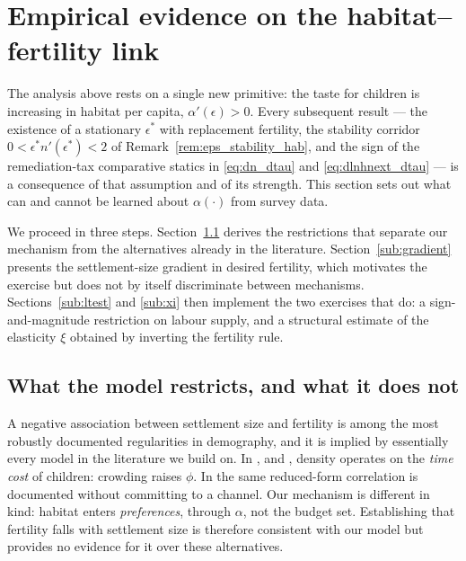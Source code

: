 \documentclass[11pt]{article}
\begin{document}

\section{Empirical evidence on the habitat--fertility link}
\label{sec:empirics}

The analysis above rests on a single new primitive: the taste for children is increasing in habitat
per capita, $\alpha'(\epsilon)>0$. Every subsequent result --- the existence of a stationary
$\epsilon^\ast$ with replacement fertility, the stability corridor $0<\epsilon^\ast
n'(\epsilon^\ast)<2$ of Remark~\ref{rem:eps_stability_hab}, and the sign of the remediation-tax
comparative statics in \eqref{eq:dn_dtau} and \eqref{eq:dlnhnext_dtau} --- is a consequence of that
assumption and of its strength. This section sets out what can and cannot be learned about
$\alpha(\cdot)$ from survey data.

We proceed in three steps. Section~\ref{sub:restrictions} derives the restrictions that separate our
mechanism from the alternatives already in the literature. Section~\ref{sub:gradient} presents the
settlement-size gradient in desired fertility, which motivates the exercise but does not by itself
discriminate between mechanisms. Sections~\ref{sub:ltest} and \ref{sub:xi} then implement the two
exercises that do: a sign-and-magnitude restriction on labour supply, and a structural estimate of
the elasticity $\xi$ obtained by inverting the fertility rule.

\subsection{What the model restricts, and what it does not}
\label{sub:restrictions}

A negative association between settlement size and fertility is among the most robustly documented
regularities in demography, and it is implied by essentially every model in the literature we build
on. In \citet{DELACROIX2012271}, \citet{DAO2013442} and \citet{dao25}, density operates on the
\emph{time cost} of children: crowding raises $\phi$. In \citet{DELACROIX201713} the same reduced-form
correlation is documented without committing to a channel. Our mechanism is different in kind:
habitat enters \emph{preferences}, through $\alpha$, not the budget set. Establishing that fertility
falls with settlement size is therefore consistent with our model but provides no evidence for it
over these alternatives.
\end{document}
